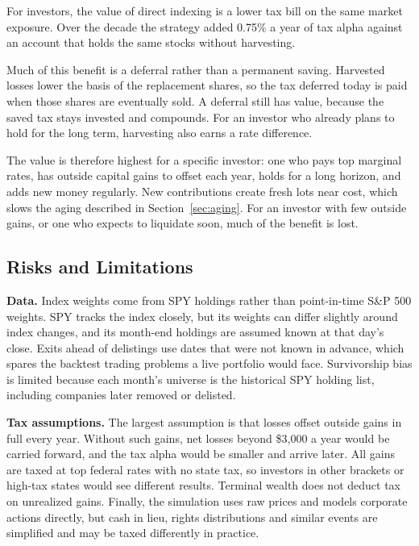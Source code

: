 For investors, the value of direct indexing is a lower tax bill on the same market exposure. Over the decade the strategy added 0.75\% a year of tax alpha against an account that holds the same stocks without harvesting. 

Much of this benefit is a deferral rather than a permanent saving. Harvested losses lower the basis of the replacement shares, so the tax deferred today is paid when those shares are eventually sold. A deferral still has value, because the saved tax stays invested and compounds. For an investor who already plans to hold for the long term, harvesting also earns a rate difference. 

The value is therefore highest for a specific investor: one who pays top marginal rates, has outside capital gains to offset each year, holds for a long horizon, and adds new money regularly. New contributions create fresh lots near cost, which slows the aging described in Section~\ref{sec:aging}. For an investor with few outside gains, or one who expects to liquidate soon, much of the benefit is lost.

\subsection{Risks and Limitations}
\label{sec:limitations}

\textbf{Data.} Index weights come from SPY holdings rather than point-in-time S\&P 500 weights. SPY tracks the index closely, but its weights can differ slightly around index changes, and its month-end holdings are assumed known at that day's close. Exits ahead of delistings use dates that were not known in advance, which spares the backtest trading problems a live portfolio would face. Survivorship bias is limited because each month's universe is the historical SPY holding list, including companies later removed or delisted.

\textbf{Tax assumptions.} The largest assumption is that losses offset outside gains in full every year. Without such gains, net losses beyond \$3{,}000 a year would be carried forward, and the tax alpha would be smaller and arrive later. All gains are taxed at top federal rates with no state tax, so investors in other brackets or high-tax states would see different results. Terminal wealth does not deduct tax on unrealized gains. Finally, the simulation uses raw prices and models corporate actions directly, but cash in lieu, rights distributions and similar events are simplified and may be taxed differently in practice.

